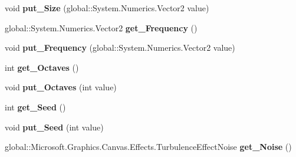 \begin{DoxyCompactItemize}
void {\bfseries put\+\_\+\+Size} (global\+::\+System.\+Numerics.\+Vector2 value)
\item 
\mbox{\label{class_microsoft_1_1_graphics_1_1_canvas_1_1_effects_1_1_turbulence_effect_a9d2a011cfbc9ce6dfd9b315f445e675f}} 
global\+::\+System.\+Numerics.\+Vector2 {\bfseries get\+\_\+\+Frequency} ()
\item 
\mbox{\label{class_microsoft_1_1_graphics_1_1_canvas_1_1_effects_1_1_turbulence_effect_a57e285cf7ec21b0c25fd2b6327ce302d}} 
void {\bfseries put\+\_\+\+Frequency} (global\+::\+System.\+Numerics.\+Vector2 value)
\item 
\mbox{\label{class_microsoft_1_1_graphics_1_1_canvas_1_1_effects_1_1_turbulence_effect_adc76a70b963e2a88b31d1953618ed24b}} 
int {\bfseries get\+\_\+\+Octaves} ()
\item 
\mbox{\label{class_microsoft_1_1_graphics_1_1_canvas_1_1_effects_1_1_turbulence_effect_aec513446282954b001d8e59dba3cffad}} 
void {\bfseries put\+\_\+\+Octaves} (int value)
\item 
\mbox{\label{class_microsoft_1_1_graphics_1_1_canvas_1_1_effects_1_1_turbulence_effect_a29a04e9d42fdf797395cdfd87bbdcfa2}} 
int {\bfseries get\+\_\+\+Seed} ()
\item 
\mbox{\label{class_microsoft_1_1_graphics_1_1_canvas_1_1_effects_1_1_turbulence_effect_a6e7659f9f3c007f28dcce1d14bbdd44a}} 
void {\bfseries put\+\_\+\+Seed} (int value)
\item 
\mbox{\label{class_microsoft_1_1_graphics_1_1_canvas_1_1_effects_1_1_turbulence_effect_ae13e3952dc96341cc6f8b4396a4d0f69}} 
global\+::\+Microsoft.\+Graphics.\+Canvas.\+Effects.\+Turbulence\+Effect\+Noise {\bfseries get\+\_\+\+Noise} ()
\item 

\end{DoxyCompactItemize}

